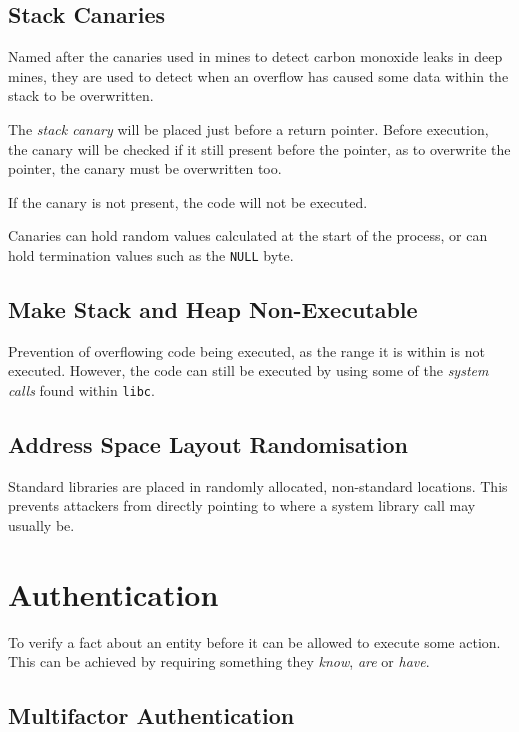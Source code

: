 \documentclass{article}
\begin{document}
\subsection{Stack Canaries}

Named after the canaries used in mines to detect carbon monoxide leaks in deep mines, they are used to detect when an overflow has caused some data within the stack to be overwritten.

The \textit{stack canary} will be placed just before a return pointer. Before execution, the canary will be checked if it still present before the pointer, as to overwrite the pointer, the canary must be overwritten too.

If the canary is not present, the code will not be executed.

Canaries can hold random values calculated at the start of the process, or can hold termination values such as the \texttt{NULL} byte.

\subsection{Make Stack and Heap Non-Executable}

Prevention of overflowing code being executed, as the range it is within is not executed. However, the code can still be executed by using some of the \textit{system calls} found within \texttt{libc}.

\subsection{Address Space Layout Randomisation}

Standard libraries are placed in randomly allocated, non-standard locations. This prevents attackers from directly pointing to where a system library call may usually be.

\section{Authentication}

To verify a fact about an entity before it can be allowed to execute some action. This can be achieved by requiring something they \textit{know}, \textit{are} or \textit{have}.

\subsection{Multifactor Authentication}
\end{document}
